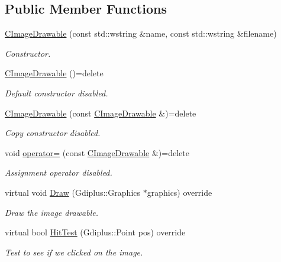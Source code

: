 \subsection*{Public Member Functions}
\begin{DoxyCompactItemize}
\item 
\hyperlink{class_c_image_drawable_a0a036788340edfd1765ae6a05cee31a0}{C\+Image\+Drawable} (const std\+::wstring \&name, const std\+::wstring \&filename)
\begin{DoxyCompactList}\small\item\em Constructor. \end{DoxyCompactList}\item 
\hypertarget{class_c_image_drawable_a0af067ad80ece0bea046dded19c5b9d4}{\hyperlink{class_c_image_drawable_a0af067ad80ece0bea046dded19c5b9d4}{C\+Image\+Drawable} ()=delete}\label{class_c_image_drawable_a0af067ad80ece0bea046dded19c5b9d4}

\begin{DoxyCompactList}\small\item\em Default constructor disabled. \end{DoxyCompactList}\item 
\hypertarget{class_c_image_drawable_a2955356238c638373d39ed99c5422cf3}{\hyperlink{class_c_image_drawable_a2955356238c638373d39ed99c5422cf3}{C\+Image\+Drawable} (const \hyperlink{class_c_image_drawable}{C\+Image\+Drawable} \&)=delete}\label{class_c_image_drawable_a2955356238c638373d39ed99c5422cf3}

\begin{DoxyCompactList}\small\item\em Copy constructor disabled. \end{DoxyCompactList}\item 
\hypertarget{class_c_image_drawable_a717129f6ce9e9fa5d9a512a85a33a8b1}{void \hyperlink{class_c_image_drawable_a717129f6ce9e9fa5d9a512a85a33a8b1}{operator=} (const \hyperlink{class_c_image_drawable}{C\+Image\+Drawable} \&)=delete}\label{class_c_image_drawable_a717129f6ce9e9fa5d9a512a85a33a8b1}

\begin{DoxyCompactList}\small\item\em Assignment operator disabled. \end{DoxyCompactList}\item 
virtual void \hyperlink{class_c_image_drawable_ada4d5d342230fbecb7169e4f3324ee52}{Draw} (Gdiplus\+::\+Graphics $\ast$graphics) override
\begin{DoxyCompactList}\small\item\em Draw the image drawable. \end{DoxyCompactList}\item 
virtual bool \hyperlink{class_c_image_drawable_a8aac5e64e309f1990e757f564dbcb8fd}{Hit\+Test} (Gdiplus\+::\+Point pos) override
\begin{DoxyCompactList}\small\item\em Test to see if we clicked on the image. \end{DoxyCompactList}\end{DoxyCompactItemize}
